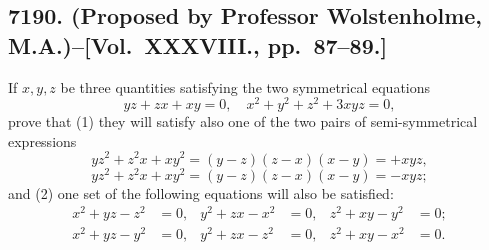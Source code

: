\documentclass[11pt,a4paper]{book}
\begin{document}
\subsection*{7190. (Proposed by Professor Wolstenholme, M.A.)\---[Vol.~XXXVIII., pp.~87--89.]}

If $x,y,z$ be three quantities satisfying the two symmetrical equations
\[
yz+zx+xy=0, \quad x^2+y^2+z^2+3xyz=0,
\]
prove that (1) they will satisfy also one of the two pairs of semi-symmetrical expressions
\[
yz^2+z^2x+xy^2 = (y-z)(z-x)(x-y) = +xyz,
\]
\[
yz^2+z^2x+xy^2 = (y-z)(z-x)(x-y) = -xyz;
\]
and (2) one set of the following equations will also be satisfied:
\[
\begin{aligned}
x^2+yz-z^2&=0, & y^2+zx-x^2&=0, & z^2+xy-y^2&=0; \\
x^2+yz-y^2&=0, & y^2+zx-z^2&=0, & z^2+xy-x^2&=0.
\end{aligned}
\]
\end{document}

